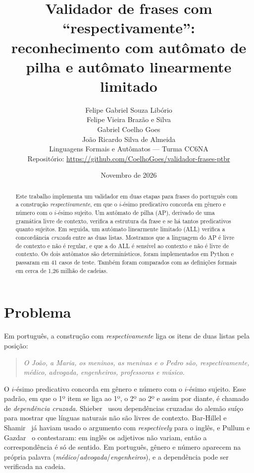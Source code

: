 \documentclass[11pt,a4paper]{article}
\title{Validador de frases com ``respectivamente'':\\
reconhecimento com autômato de pilha e autômato linearmente limitado}
\author{%
  Felipe Gabriel Souza Libório\\
  Felipe Vieira Brazão e Silva\\
  Gabriel Coelho Goes\\
  João Ricardo Silva de Almeida\\[8pt]
  Linguagens Formais e Autômatos --- Turma CC6NA\\
  Repositório: \url{https://github.com/CoelhoGoes/validador-frases-ptbr}}
\date{Novembro de 2026}
\begin{document}
\maketitle

\begin{abstract}
Este trabalho implementa um validador em duas etapas para frases do português com a construção \emph{respectivamente}, em que o $i$-ésimo predicativo concorda em gênero e número com o $i$-ésimo sujeito. Um autômato de pilha (AP), derivado de uma gramática livre de contexto, verifica a estrutura da frase e se há tantos predicativos quanto sujeitos. Em seguida, um autômato linearmente limitado (ALL) verifica a concordância \emph{cruzada} entre as duas listas. Mostramos que a linguagem do AP é livre de contexto e não é regular, e que a do ALL é sensível ao contexto e não é livre de contexto. Os dois autômatos são determinísticos, foram implementados em Python e passaram em 41 casos de teste. Também foram comparados com as definições formais em cerca de 1,26 milhão de cadeias.
\end{abstract}

\tableofcontents

\section{Problema}

Em português, a construção com \emph{respectivamente} liga os itens de duas listas pela posição:

\begin{quote}
\emph{O João, a Maria, os meninos, as meninas e o Pedro são, respectivamente, médico, advogada, engenheiros, professoras e músico.}
\end{quote}

O $i$-ésimo predicativo concorda em gênero e número com o $i$-ésimo sujeito. Esse padrão, em que o 1º item se liga ao 1º, o 2º ao 2º e assim por diante, é chamado de \emph{dependência cruzada}. Shieber~\cite{shieber} usou dependências cruzadas do alemão suíço para mostrar que línguas naturais não são livres de contexto. Bar-Hillel e Shamir~\cite{barhillel} já haviam usado o argumento com \emph{respectively} para o inglês, e Pullum e Gazdar~\cite{pullum} o contestaram: em inglês os adjetivos não variam, então a correspondência é só de sentido. Em português, gênero e número aparecem na própria palavra (\emph{médico}/\emph{advogada}/\emph{engenheiros}), e a dependência pode ser verificada na cadeia.
\end{document}
